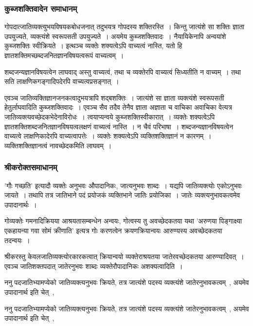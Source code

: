 			\subsubsection{कुब्जशक्तिवादेन समाधानम्}

				गोपदात्जातिव्यक्त्युभयविषयकबोधजनात् तदुभयत्र गोपदस्य शक्तिरस्ति~। किन्तु जात्यंशे सा शक्तिः ज्ञाता उपयुज्यते, व्यक्त्यंशे स्वरूपसती उपयुज्यते~। अयमेय कुब्जशक्तिवादः~। नैयायिकेनापि अन्वयांशे कुब्जशक्तिः स्वीक्रियते~। इत्थञ्च व्यक्तेः शक्यत्वेऽपि वाच्यत्वं नास्ति, यतो हि ज्ञातशक्तिमच्छब्दजनितज्ञानविषयत्वरूपं वाच्यत्वम्~।

				शब्दजन्यज्ञानविषयत्वेन लाघवाद् अस्तु वाच्यत्वं, तथा च व्यक्तेरपि वाच्यत्वं       सिध्यतीति न वाच्यम्~। तथा सति लाक्षणिकगङ्गादिपदेरपि वाच्यत्वप्रसङ्गात्~। 

				\begin{small}

					एवञ्च  जातिव्यक्तिज्ञानजनकत्वादुभयत्रापि शद्बशक्तिः~। जात्यंशे सा ज्ञाता व्यक्त्यंशे स्वरूपसती हेतुर्लाघवादिति कुब्जशक्तिवादः~। एवञ्च सैव तदैव तेनैव ज्ञाता अज्ञाता च वाचिका अवाचिका वेत्यत्र जातिव्यक्त्यवच्छेदकभेदेनाविरोधः~। त्वयाप्यन्वये कुब्जशक्तिस्वीकारात्~। व्यक्तेः शक्यत्वेऽपि ज्ञातशक्तिशब्दजनितज्ञानविषयत्वलक्षणं वाच्यत्वं नास्ति~। न चैवं परिभाषा~। शब्दजन्यज्ञानविषयत्वेन वाच्यत्वे लाक्षणिकादेरपि वाच्यत्वापत्तेः~। व्यक्तेः शक्यत्वेऽपि व्यक्तिशक्तिज्ञानं न कारणम्~। व्यक्तिशक्तिज्ञानत्वं नावच्छेदकमिति लाघवम्~।
				\end{small}



			\subsubsection{श्रीकरोक्तसमाधानम्}
			
				'गौः गच्छति' इत्यादौ व्यक्तेः अनुभवः औपादानिकः, जात्यनुभवः शाब्दः~। यद्यपि जातिव्यक्त्योः एकोऽनुभवः जायते~। तथापि तत्र जातिभाने पदं प्रयोजकं व्यक्तिभाने जातिः प्रयोजिका~। जातेः व्यक्त्यनुभावकत्वमेव उपादानार्थः~।

				गोव्यक्तेः गमनादिक्रियया आश्रयतासम्बन्धेन अन्वयः, गोत्वस्य तु अवच्छेदकतया यथा 'अरुणया पिङ्गाक्ष्या एकहायन्या गवा सोमं क्रीणाति' इत्यत्र गोः करणत्वेन क्रयणक्रियान्वयः आरुण्यस्य अवच्छेदकतया तदन्वयः~। 
	
				\begin{small}
					
					श्रीकरस्तु केवलजातिव्यक्त्योरकारकत्वात् क्रियान्वयो व्यक्तेराश्रयतया जातेरवच्छेदकतया आरुण्यादिवत्~। एवञ्च जातिशक्तपदात् जातेरनुभवः शाब्दः व्यक्तेरौपादानिकः अशक्यत्वादिति~। 
	
					ननु पदजातिभ्यामप्येको जातिव्यक्त्यनुभवः क्रियते, तत्र जात्यंशे पदस्य व्यक्त्यंशे जातेरनुभावकत्वम्~, अयमेव उपादानार्थ इति चेत्~, 

					ननु पदजातिभ्यामप्येको जातिव्यक्त्यनुभवः क्रियते, तत्र जात्यंशे पदस्य व्यक्त्यंशे जातेरनुभावकत्वम्~, अयमेव उपादानार्थ इति चेत्~, 
				\end{small}

